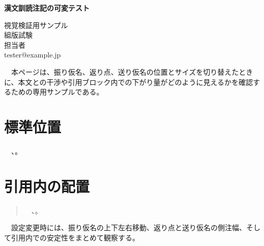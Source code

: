 \documentclass[lualatex,paper=a4,fontsize=12pt,jafontsize=12pt,line_length=30zw,number_of_lines=30,baselineskip=23.42610pt]{jlreq}
\author{}
\date{}
\begin{document}
\begin{center}
{\fontsize{14pt}{14pt}\selectfont\bfseries 漢文訓読注記の可変テスト}
\end{center}

\begin{flushright}
視覚検証用サンプル\\
組版試験\\
担当者\\
tester@example.jp
\end{flushright}
\vspace{\baselineskip}

　本ページは、振り仮名、返り点、送り仮名の位置とサイズを切り替えたときに、本文との干渉や引用ブロック内での下がり量がどのように見えるかを確認するための専用サンプルである。

\hypertarget{ux6a19ux6e96ux4f4dux7f6e}{%
\section{標準位置}\label{ux6a19ux6e96ux4f4dux7f6e}}

　、。

\hypertarget{ux5f15ux7528ux5185ux306eux914dux7f6e}{%
\section{引用内の配置}\label{ux5f15ux7528ux5185ux306eux914dux7f6e}}

\begin{quote}
　、。
\end{quote}

　設定変更時には、振り仮名の上下左右移動、返り点と送り仮名の側注幅、そして引用内での安定性をまとめて観察する。
\end{document}
